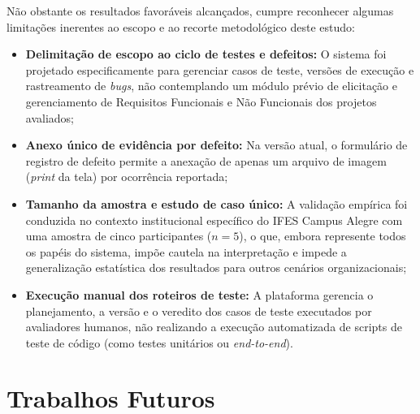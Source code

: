 Não obstante os resultados favoráveis alcançados, cumpre reconhecer algumas limitações inerentes ao escopo e ao recorte metodológico deste estudo:
\begin{itemize}
    \item \textbf{Delimitação de escopo ao ciclo de testes e defeitos:} O sistema foi projetado especificamente para gerenciar casos de teste, versões de execução e rastreamento de \textit{bugs}, não contemplando um módulo prévio de elicitação e gerenciamento de Requisitos Funcionais e Não Funcionais dos projetos avaliados;
    \item \textbf{Anexo único de evidência por defeito:} Na versão atual, o formulário de registro de defeito permite a anexação de apenas um arquivo de imagem (\textit{print} da tela) por ocorrência reportada;
    \item \textbf{Tamanho da amostra e estudo de caso único:} A validação empírica foi conduzida no contexto institucional específico do IFES Campus Alegre com uma amostra de cinco participantes ($n = 5$), o que, embora represente todos os papéis do sistema, impõe cautela na interpretação e impede a generalização estatística dos resultados para outros cenários organizacionais;
    \item \textbf{Execução manual dos roteiros de teste:} A plataforma gerencia o planejamento, a versão e o veredito dos casos de teste executados por avaliadores humanos, não realizando a execução automatizada de scripts de teste de código (como testes unitários ou \textit{end-to-end}).
\end{itemize}

\section{Trabalhos Futuros}

